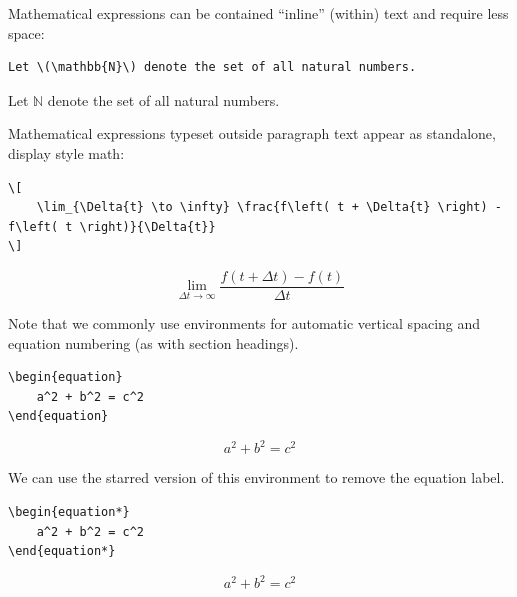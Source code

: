\documentclass[11pt, twoside]{article}
\begin{document}
Mathematical expressions can be contained ``inline'' (within) text and
require less space:
\begin{verbatim}
Let \(\mathbb{N}\) denote the set of all natural numbers.
\end{verbatim}
\begin{outputbox}
    Let \(\mathbb{N}\) denote the set of all natural numbers.
\end{outputbox}
Mathematical expressions typeset outside paragraph text appear as standalone, display style math:
\begin{verbatim}
\[
    \lim_{\Delta{t} \to \infty} \frac{f\left( t + \Delta{t} \right) - f\left( t \right)}{\Delta{t}}
\]
\end{verbatim}
\begin{outputbox}
    \[
        \lim_{\Delta{t} \to \infty} \frac{f\left( t + \Delta{t} \right) - f\left( t \right)}{\Delta{t}}
    \]
\end{outputbox}
Note that we commonly use \texttt{\equation} environments for automatic vertical spacing and equation numbering
(as with section headings).
\begin{verbatim}
\begin{equation}
    a^2 + b^2 = c^2
\end{equation}
\end{verbatim}
\begin{outputbox}
    \begin{equation}
        a^2 + b^2 = c^2
    \end{equation}
\end{outputbox}
We can use the starred version of this environment to remove the equation label.
\begin{verbatim}
\begin{equation*}
    a^2 + b^2 = c^2
\end{equation*}
\end{verbatim}
\begin{outputbox}
    \begin{equation*}
        a^2 + b^2 = c^2
    \end{equation*}
\end{outputbox}
\end{document}
